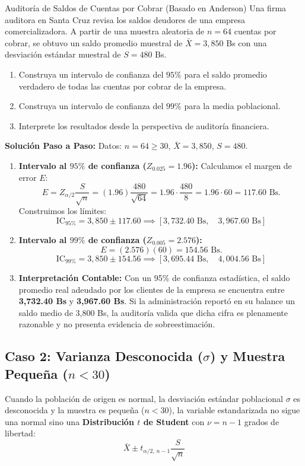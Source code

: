 \begin{ejemplo}{Auditoría de Saldos de Cuentas por Cobrar (Basado en Anderson)}
Una firma auditora en Santa Cruz revisa los saldos deudores de una empresa comercializadora. A partir de una muestra aleatoria de $n = 64$ cuentas por cobrar, se obtuvo un saldo promedio muestral de $\bar{X} = 3{,}850$ Bs con una desviación estándar muestral de $S = 480$ Bs.
\begin{enumerate}[label=\alph*)]
    \item Construya un intervalo de confianza del $95\%$ para el saldo promedio verdadero de todas las cuentas por cobrar de la empresa.
    \item Construya un intervalo de confianza del $99\%$ para la media poblacional.
    \item Interprete los resultados desde la perspectiva de auditoría financiera.
\end{enumerate}

\tcbline
\textbf{Solución Paso a Paso:}
Datos: $n = 64 \ge 30$, $\bar{X} = 3{,}850$, $S = 480$.
\begin{enumerate}[label=\alph*)]
    \item \textbf{Intervalo al $95\%$ de confianza ($Z_{0.025} = 1.96$):}
    Calculamos el margen de error $E$:
    \[
    E = Z_{\alpha/2} \frac{S}{\sqrt{n}} = (1.96) \frac{480}{\sqrt{64}} = 1.96 \cdot \frac{480}{8} = 1.96 \cdot 60 = 117.60 \text{ Bs.}
    \]
    Construimos los límites:
    \[
    \text{IC}_{95\%} = 3{,}850 \pm 117.60 \implies [3{,}732.40 \text{ Bs}, \quad 3{,}967.60 \text{ Bs}]
    \]
    
    \item \textbf{Intervalo al $99\%$ de confianza ($Z_{0.005} = 2.576$):}
    \[
    E = (2.576)(60) = 154.56 \text{ Bs.}
    \]
    \[
    \text{IC}_{99\%} = 3{,}850 \pm 154.56 \implies [3{,}695.44 \text{ Bs}, \quad 4{,}004.56 \text{ Bs}]
    \]
    
    \item \textbf{Interpretación Contable:} Con un 95\% de confianza estadística, el saldo promedio real adeudado por los clientes de la empresa se encuentra entre \textbf{3,732.40 Bs} y \textbf{3,967.60 Bs}. Si la administración reportó en su balance un saldo medio de 3,800 Bs, la auditoría valida que dicha cifra es plenamente razonable y no presenta evidencia de sobreestimación.
\end{enumerate}
\end{ejemplo}

\subsection{Caso 2: Varianza Desconocida ($\sigma$) y Muestra Pequeña ($n < 30$)}
Cuando la población de origen es normal, la desviación estándar poblacional $\sigma$ es desconocida y la muestra es pequeña ($n < 30$), la variable estandarizada no sigue una normal sino una \textbf{Distribución $t$ de Student} con $\nu = n - 1$ grados de libertad:
\begin{equation}
    \bar{X} \pm t_{\alpha/2, \, n-1} \frac{S}{\sqrt{n}}
\end{equation}

